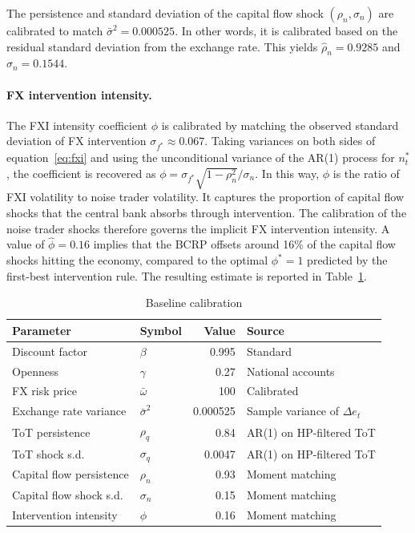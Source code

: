 \documentclass[12pt,a4paper]{article}
\begin{document}
The persistence and standard deviation of the capital flow shock $(\rho_n, \sigma_n)$ are calibrated to match $\bar{\sigma}^2 = 0.000525$. In other words, it is calibrated based on the residual standard deviation from the exchange rate. This yields $\hat{\rho}_n = 0.9285$ and $\hat{\sigma}_n = 0.1544$.

\paragraph{FX intervention intensity.} The FXI intensity coefficient $\phi$ is calibrated by matching the observed standard deviation of FX intervention $\sigma_{f^*} \approx 0.067$. Taking variances on both sides of equation~\eqref{eq:fxi} and using the unconditional variance of the AR(1) process for $n^*_t$, the coefficient is recovered as $\phi = \sigma_{f^*}\sqrt{1 - \rho_n^2}/\sigma_n$. In this way, $\phi$ is the ratio of FXI volatility to noise trader volatility. It captures the proportion of capital flow shocks that the central bank absorbs through intervention. The calibration of the noise trader shocks therefore governs the implicit FX intervention intensity. A value of $\hat{\phi} = 0.16$ implies that the BCRP offsets around 16\% of the capital flow shocks hitting the economy, compared to the optimal $\phi^* = 1$ predicted by the first-best intervention rule. The resulting estimate is reported in Table~\ref{tab:calibration}.

\begin{table}[H]
    \centering
    \begin{singlespace}
    \caption{Baseline calibration}
    \label{tab:calibration}
    \begin{tabular}{llrl}
        \toprule
        Parameter & Symbol & Value & Source \\
        \midrule
        Discount factor & $\beta$ & 0.995 & Standard \\
        Openness & $\gamma$ & 0.27 & National accounts \\
        FX risk price & $\bar{\omega}$ & 100 & Calibrated \\
        Exchange rate variance & $\bar{\sigma}^2$ & 0.000525 & Sample variance of $\Delta e_t$ \\
        ToT persistence & $\rho_q$ & 0.84 & AR(1) on HP-filtered ToT \\
        ToT shock s.d. & $\sigma_q$ & 0.0047 & AR(1) on HP-filtered ToT \\
        Capital flow persistence & $\rho_n$ & 0.93 & Moment matching \\
        Capital flow shock s.d. & $\sigma_n$ & 0.15 & Moment matching \\
        Intervention intensity & $\phi$ & 0.16 & Moment matching \\
        \bottomrule
    \end{tabular}
    \end{singlespace}
\end{table}
\end{document}
